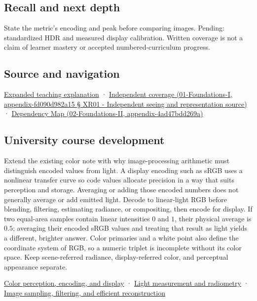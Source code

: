 \subsection{Recall and next depth}\label{recall-and-next-depth}

State the metric's encoding and peak before comparing images. Pending: standardized HDR and measured display calibration. Written coverage is not a claim of learner mastery or accepted numbered-curriculum progress.

\subsection{Source and navigation}\label{source-and-navigation}

\href{Continuous\%20Notes/University\%20-\%20Worlds,\%20Images\%20and\%20Inference\%20-\%20Graphics,\%20Vision\%20and\%20Photography\#Encoded\%20RGB\%20must\%20not\%20masquerade\%20as\%20linear\%20light}{Expanded teaching explanation} · \href{}{Independent coverage (01-Foundations-I, appendix-fd090d982a15 § XR01 - Independent seeing and representation source)} · \href{}{Dependency Map (02-Foundations-II, appendix-4ad47bdd269a)}

\subsection{University course development}\label{university-course-development}

Extend the existing color note with why image-processing arithmetic must distinguish encoded values from light. A display encoding such as sRGB uses a nonlinear transfer curve so code values allocate precision in a way that suits perception and storage. Averaging or adding those encoded numbers does not generally average or add emitted light. Decode to linear-light RGB before blending, filtering, estimating radiance, or compositing, then encode for display. If two equal-area samples contain linear intensities \(0\) and \(1\), their physical average is \(0.5\); averaging their encoded sRGB values and treating that result as light yields a different, brighter answer. Color primaries and a white point also define the coordinate system of RGB, so a numeric triplet is incomplete without its color space. Keep scene-referred radiance, display-referred color, and perceptual appearance separate.

\href{Continuous\%20Notes/University\%20-\%20Worlds,\%20Images\%20and\%20Inference\%20-\%20Graphics,\%20Vision\%20and\%20Photography\#Color\%20perception,\%20encoding,\%20and\%20display}{Color perception, encoding, and display} · \href{Continuous\%20Notes/University\%20-\%20Worlds,\%20Images\%20and\%20Inference\%20-\%20Graphics,\%20Vision\%20and\%20Photography\#Light\%20measurement\%20and\%20radiometry}{Light measurement and radiometry} · \href{Continuous\%20Notes/University\%20-\%20Worlds,\%20Images\%20and\%20Inference\%20-\%20Graphics,\%20Vision\%20and\%20Photography\#Image\%20sampling,\%20filtering,\%20and\%20efficient\%20reconstruction}{Image sampling, filtering, and efficient reconstruction}
